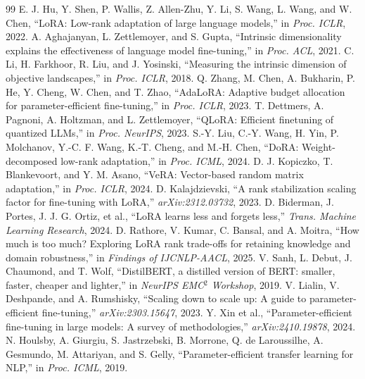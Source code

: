 \documentclass[conference]{IEEEtran}
\begin{document}
\begin{thebibliography}{99}
 E. J. Hu, Y. Shen, P. Wallis, Z. Allen-Zhu, Y. Li, S. Wang, L. Wang, and W. Chen, ``LoRA: Low-rank adaptation of large language models,'' in \textit{Proc. ICLR}, 2022.
 A. Aghajanyan, L. Zettlemoyer, and S. Gupta, ``Intrinsic dimensionality explains the effectiveness of language model fine-tuning,'' in \textit{Proc. ACL}, 2021.
 C. Li, H. Farkhoor, R. Liu, and J. Yosinski, ``Measuring the intrinsic dimension of objective landscapes,'' in \textit{Proc. ICLR}, 2018.
 Q. Zhang, M. Chen, A. Bukharin, P. He, Y. Cheng, W. Chen, and T. Zhao, ``AdaLoRA: Adaptive budget allocation for parameter-efficient fine-tuning,'' in \textit{Proc. ICLR}, 2023.
 T. Dettmers, A. Pagnoni, A. Holtzman, and L. Zettlemoyer, ``QLoRA: Efficient finetuning of quantized LLMs,'' in \textit{Proc. NeurIPS}, 2023.
 S.-Y. Liu, C.-Y. Wang, H. Yin, P. Molchanov, Y.-C. F. Wang, K.-T. Cheng, and M.-H. Chen, ``DoRA: Weight-decomposed low-rank adaptation,'' in \textit{Proc. ICML}, 2024.
 D. J. Kopiczko, T. Blankevoort, and Y. M. Asano, ``VeRA: Vector-based random matrix adaptation,'' in \textit{Proc. ICLR}, 2024.
 D. Kalajdzievski, ``A rank stabilization scaling factor for fine-tuning with LoRA,'' \textit{arXiv:2312.03732}, 2023.
 D. Biderman, J. Portes, J. J. G. Ortiz, et al., ``LoRA learns less and forgets less,'' \textit{Trans. Machine Learning Research}, 2024.
 D. Rathore, V. Kumar, C. Bansal, and A. Moitra, ``How much is too much? Exploring LoRA rank trade-offs for retaining knowledge and domain robustness,'' in \textit{Findings of IJCNLP-AACL}, 2025.
 V. Sanh, L. Debut, J. Chaumond, and T. Wolf, ``DistilBERT, a distilled version of BERT: smaller, faster, cheaper and lighter,'' in \textit{NeurIPS EMC$^2$ Workshop}, 2019.
 V. Lialin, V. Deshpande, and A. Rumshisky, ``Scaling down to scale up: A guide to parameter-efficient fine-tuning,'' \textit{arXiv:2303.15647}, 2023.
 Y. Xin et al., ``Parameter-efficient fine-tuning in large models: A survey of methodologies,'' \textit{arXiv:2410.19878}, 2024.
 N. Houlsby, A. Giurgiu, S. Jastrzebski, B. Morrone, Q. de Laroussilhe, A. Gesmundo, M. Attariyan, and S. Gelly, ``Parameter-efficient transfer learning for NLP,'' in \textit{Proc. ICML}, 2019.

\end{thebibliography}
\end{document}
